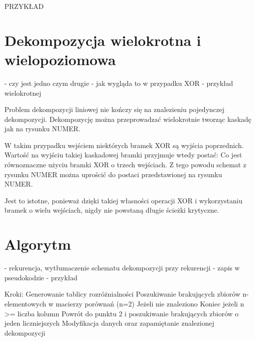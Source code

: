 PRZYKŁAD


\section{Dekompozycja wielokrotna i wielopoziomowa}
	- czy jest jedno czym drugie
	- jak wygląda to w przypadku XOR
	- przykład wielokrotnej

Problem dekompozycji liniowej nie kończy się na znalezieniu pojedynczej dekompozycji.
Dekompozycję można przeprowadzać wielokrotnie tworząc kaskadę jak na rysunku NUMER.

W takim przypadku wejściem niektórych bramek XOR są wyjścia poprzednich.
Wartość na wyjściu takiej kaskadowej bramki przyjmuje wtedy postać:
Co jest równoznaczne użyciu bramki XOR o trzech wejściach.
Z tego powodu schemat z rysunku NUMER można uprościć do postaci przedstawionej na rysunku NUMER.

Jest to istotne, ponieważ dzięki takiej własności operacji XOR i wykorzystaniu bramek o wielu wejściach, nigdy nie powstaną długie ścieżki krytyczne.

\section{Algorytm}
- rekurencja, wytłumaczenie schematu dekompozycji przy rekurencji
- zapis w pseudokodzie
- przykład

Kroki:
Generowanie tablicy rozróżnialności
Poszukiwanie brakujących zbiorów n-elementowych w macierzy porównań (n=2)
Jeżeli nie znaleziono
Koniec jeżeli n >= liczba kolumn
Powrót do punktu 2 i poszukiwanie brakujących zbiorów o jeden liczniejszych
Modyfikacja danych oraz zapamiętanie znalezionej dekompozycji
